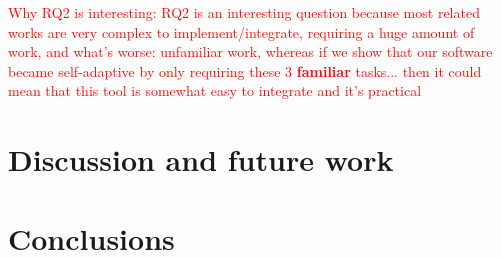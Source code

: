 \textcolor{red}{Why RQ2 is interesting: RQ2 is an interesting question because most related works are very complex to implement/integrate, requiring a huge amount of work, and what's worse: unfamiliar work, whereas if we show that our software became self-adaptive by only requiring these 3 \textbf{familiar} tasks... then it could mean that this tool is somewhat easy to integrate and it's practical}

\section{Discussion and future work}

\section{Conclusions}


\nocite{*}

\begin{acks}

\end{acks} 